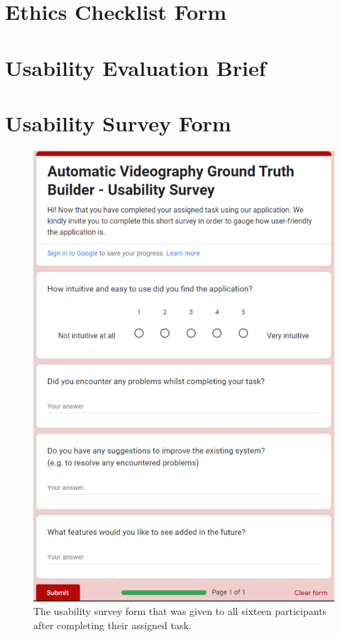 \documentclass{l4proj}
\begin{document}
\begin{appendices}
\chapter{Ethics Checklist Form}
\label{app:ethics_checklist}



\chapter{Usability Evaluation Brief}
\label{app:usability_eval_brief}



\chapter{Usability Survey Form}
\label{app:usability_survey}
\begin{figure}
    \centering
    \includegraphics[width=1\textwidth]{figures/usability_survey.pdf}
    \caption{The usability survey form that was given to all sixteen participants after completing their assigned task.}
    \label{fig:usability_survey}
\end{figure}

\end{appendices}




\renewcommand{\thechapter}{0} 

\end{document}
